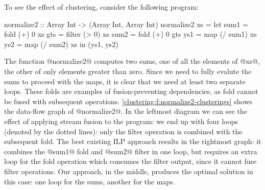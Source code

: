 To see the effect of clustering, consider the following program:
\begin{code}
 normalize2 :: Array Int -> (Array Int, Array Int)
 normalize2 xs
  = let sum1 = fold   (+)  0   xs
        gts  = filter (>   0)  xs
        sum2 = fold   (+)  0   gts
        ys1  = map    (/ sum1) xs
        ys2  = map    (/ sum2) xs
    in (ys1, ys2)
\end{code}

The function @normalize2@ computes two sums, one of all the elements of @xs@, the other of only elements greater than zero. Since we need to fully evalute the sums to proceed with the maps, it is clear that we need at least two separate loops. These folds are examples of fusion-preventing dependencies, as fold cannot be fused with subsequent operations. \autoref{clustering:f:normalize2-clusterings} shows the data-flow graph of @normalize2@. In the leftmost diagram we can see the effect of applying stream fusion to the program: we end up with four loops (denoted by the dotted lines): only the filter operation is combined with the subsequent fold. The best existing ILP approach results in the rightmost graph: it combines the @sum1@ fold and @sum2@ filter in one loop, but requires an extra loop for the fold operation which consumes the filter output, since it cannot fuse filter operations. Our approach, in the middle, produces the optimal solution in this case: one loop for the sums, another for the maps.


